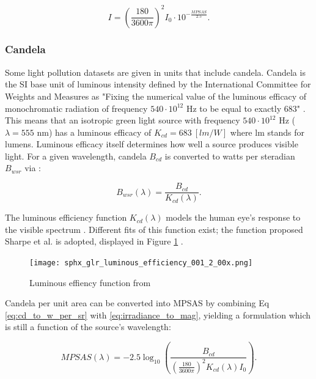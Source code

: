 \begin{equation} \label{eq:mpsas_to_irrad_per_ster}
  I = \left( \frac{180}{ 3600\pi} \right)^2 I_0 \cdot 10^{-\frac{MPSAS}{2.5}}.
\end{equation}

\subsubsection{Candela} \label{sec:candela}

Some light pollution datasets are given in units that include candela. Candela is the SI base unit of luminous intensity defined by the International Committee for Weights and Measures as "Fixing the numerical value of the luminous efficacy of monochromatic radiation of frequency $540\cdot10^{12}$ Hz to be equal to exactly $683$" \cite{nist_units}. This means that an isotropic green light source with frequency $540\cdot10^{12}$ Hz ($\lambda = 555$ nm) has a luminous efficacy of $K_{cd} = 683 \: \left[ lm/W \right]$ where lm stands for lumens. Luminous efficacy itself determines how well a source produces visible light. For a given wavelength, candela $B_{cd}$ is converted to watts per steradian $B_{wsr}$ via \cite{nist_units}:

\begin{equation} \label{eq:cd_to_w_per_sr}
  B_{wsr}(\lambda) = \frac{B_{cd}}{K_{cd}(\lambda)}.
\end{equation}

The luminous efficiency function $K_{cd}(\lambda)$ models the human eye's response to the visible spectrum \cite{sharpe2005}. Different fits of this function exist; the function proposed Sharpe et al. is adopted, displayed in Figure \ref{fig:luminous_efficiency} \cite{sharpe2005}.

\begin{figure}[ht]
  \centering
  \texttt{[image: sphx\_glr\_luminous\_efficiency\_001\_2\_00x.png]}
  \caption{Luminous effiency function from \cite{sharpe2005}}
  \label{fig:luminous_efficiency}
\end{figure}

Candela per unit area can be converted into MPSAS by combining Eq \ref{eq:cd_to_w_per_sr} with \ref{eq:irradiance_to_mag}, yielding a formulation which is still a function of the source's wavelength:

\begin{equation} \label{eq:cd_per_m2_to_mpsas}
  MPSAS(\lambda) = -2.5 \log_{10}\left( \frac{B_{cd}}{\left( \frac{180}{ 3600\pi} \right)^2 K_{cd}(\lambda) I_0} \right).
\end{equation}

